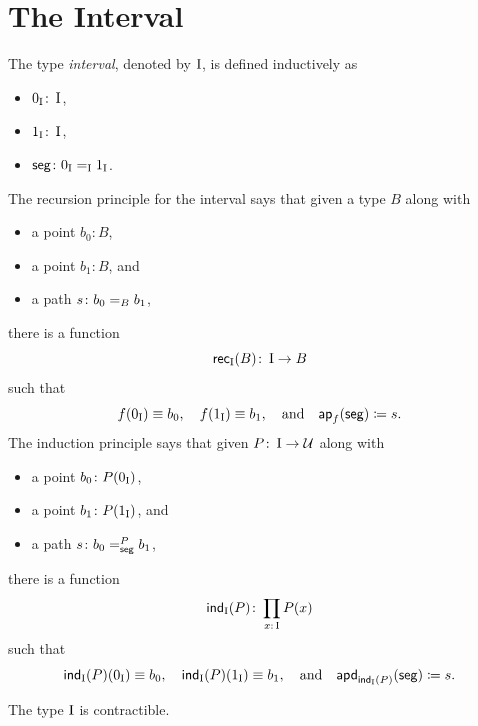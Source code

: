 \section{The Interval}

The type \textsl{interval}, denoted by $\operatorname{I}$, is defined inductively as
\begin{itemize}
    \item $0_{\op I}\colon\op I$,
    \item $1_{\op I}\colon\op I$,
    \item $\fun{seg}\colon 0_{\op I}\eq{\op I}1_{\op I}$.
\end{itemize}

The recursion principle for the interval says that given a type $B$ along with
\begin{itemize}
    \item a point $b_0\colon B$,
    \item a point $b_1\colon B$, and
    \item a path $s\colon b_0\eq Bb_1$,
\end{itemize}
there is a function
\[
    \fun{rec}_{\op I}(B)\colon\op I\to B
\]
such that
\[
    f(0_{\operatorname{I}})\equiv b_0,\quad
    f(1_{\operatorname{I}})\equiv b_1,\quad\text{and}\quad
    \mathsf{ap}_f(\mathsf{seg})\coloneqq s.
\]
The induction principle says that given $P\colon\op I\to\univ$ along with
\begin{itemize}
    \item a point $b_0\colon P(0_{\op I})$,
    \item a point $b_1\colon P(1_{\op I})$, and
    \item a path $s\colon b_0\eqt{\fun{seg}}{P} b_1$,
\end{itemize}
there is a function
\[
    \fun{ind}_{\op I}(P)\colon\prod_{x\colon\op I}P(x)
\]
such that
\[
    \mathsf{ind}_{\operatorname{I}}(P)(0_{\operatorname{I}})\equiv b_0,\quad
    \mathsf{ind}_{\operatorname{I}}(P)(1_{\operatorname{I}})\equiv b_1,\quad\text{and}\quad
    \mathsf{apd}_{\mathsf{ind}_{\operatorname{I}}(P)}(\mathsf{seg})\coloneqq s.
\]

\begin{prop}
    The type\/ $\operatorname{I}$ is contractible.
\end{prop}

